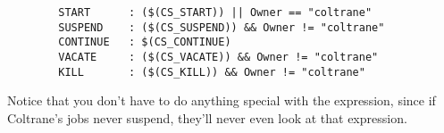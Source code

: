 \begin{verbatim}
        START      : ($(CS_START)) || Owner == "coltrane"
        SUSPEND    : ($(CS_SUSPEND)) && Owner != "coltrane"
        CONTINUE   : $(CS_CONTINUE)
        VACATE     : ($(CS_VACATE)) && Owner != "coltrane"
        KILL       : ($(CS_KILL)) && Owner != "coltrane"
\end{verbatim}

Notice that you don't have to do anything special with the
 expression, since if Coltrane's jobs never suspend,
they'll never even look at that expression.
